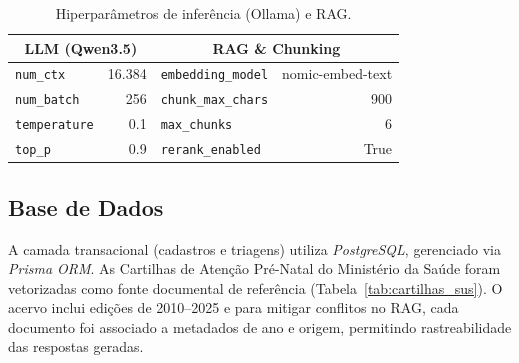 \begin{table}[h!]
  \centering
  \caption{Hiperparâmetros de inferência (Ollama) e RAG.}
  \label{tab:hyperparams}
  \small
  \begin{tabular}{l r | l r}
    \toprule
    \multicolumn{2}{c}{\textbf{LLM (Qwen3.5)}} & \multicolumn{2}{c}{\textbf{RAG \& Chunking}} \\
    \midrule
    \texttt{num\_ctx}                          & 16.384 & \texttt{embedding\_model}  & nomic-embed-text \\
    \texttt{num\_batch}                        & 256    & \texttt{chunk\_max\_chars} & 900              \\
    \texttt{temperature}                       & 0.1    & \texttt{max\_chunks}       & 6                \\
    \texttt{top\_p}                            & 0.9    & \texttt{rerank\_enabled}   & True             \\
    \bottomrule
  \end{tabular}
\end{table}

\subsection{Base de Dados}

A camada transacional (cadastros e triagens) utiliza \textit{PostgreSQL}, gerenciado via \textit{Prisma ORM}. 
As Cartilhas de Atenção Pré-Natal do Ministério da Saúde foram vetorizadas como fonte documental de referência (Tabela~\ref{tab:cartilhas_sus}).
O acervo inclui edições de 2010--2025 e para mitigar conflitos no RAG, cada documento foi associado a metadados de ano e origem, permitindo rastreabilidade das respostas geradas.

